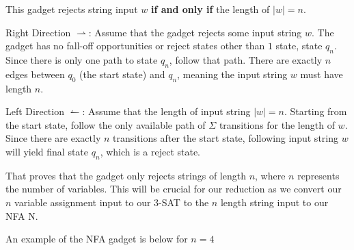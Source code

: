 \documentclass[12pt]{article}
\begin{document}
\begin{solution}
    This gadget rejects string input $w$ \textbf{if and only if} the length of $|w| = n$.
    
    Right Direction $\rightharpoonup$:
    Assume that the gadget rejects some input string $w$. The gadget has no fall-off opportunities or reject states other than $1$ state, state $q_n$. Since there is only one path to state $q_n$, follow that path. There are exactly $n$ edges between $q_0$ (the start state) and $q_n$, meaning the input string $w$ must have length $n$.
    
    Left Direction $\leftharpoonup$: Assume that the length of input string $|w| = n$. Starting from the start state, follow the only available path of $\Sigma$ transitions for the length of $w$. Since there are exactly $n$ transitions after the start state, following input string $w$ will yield final state $q_n$, which is a reject state.
    
    That proves that the gadget only rejects strings of length $n$, where $n$ represents the number of variables. This will be crucial for our reduction as we convert our $n$ variable assignment input to our 3-SAT to the $n$ length string input to our NFA N.
    
    An example of the NFA gadget is below for $n=4$
    
    
    \newcount\N
    
\end{solution}
\end{document}
